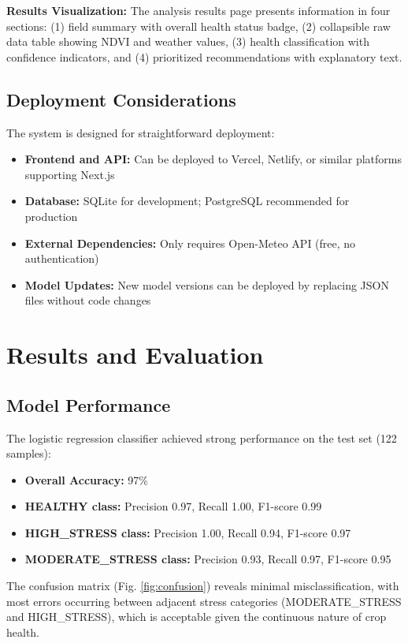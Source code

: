\documentclass[journal]{IEEEtran}
\begin{document}
\textbf{Results Visualization:} The analysis results page presents information in four sections: (1) field summary with overall health status badge, (2) collapsible raw data table showing NDVI and weather values, (3) health classification with confidence indicators, and (4) prioritized recommendations with explanatory text.

\subsection{Deployment Considerations}

The system is designed for straightforward deployment:
\begin{itemize}
\item \textbf{Frontend and API:} Can be deployed to Vercel, Netlify, or similar platforms supporting Next.js
\item \textbf{Database:} SQLite for development; PostgreSQL recommended for production
\item \textbf{External Dependencies:} Only requires Open-Meteo API (free, no authentication)
\item \textbf{Model Updates:} New model versions can be deployed by replacing JSON files without code changes
\end{itemize}

\section{Results and Evaluation}

\subsection{Model Performance}

The logistic regression classifier achieved strong performance on the test set (122 samples):

\begin{itemize}
\item \textbf{Overall Accuracy:} 97\%
\item \textbf{HEALTHY class:} Precision 0.97, Recall 1.00, F1-score 0.99
\item \textbf{HIGH\_STRESS class:} Precision 1.00, Recall 0.94, F1-score 0.97
\item \textbf{MODERATE\_STRESS class:} Precision 0.93, Recall 0.97, F1-score 0.95
\end{itemize}

The confusion matrix (Fig. \ref{fig:confusion}) reveals minimal misclassification, with most errors occurring between adjacent stress categories (MODERATE\_STRESS and HIGH\_STRESS), which is acceptable given the continuous nature of crop health.
\end{document}
